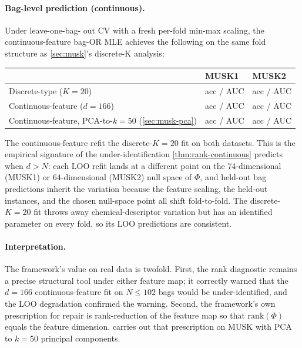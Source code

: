 \paragraph{Bag-level prediction (continuous).} Under leave-one-bag-
out CV with a fresh per-fold min-max scaling, the continuous-feature
bag-OR MLE achieves the following on the same fold structure as
\cref{sec:musk}'s discrete-K analysis:
\begin{center}\small
\begin{tabular}{lll}
\toprule
                                                   & MUSK1                          & MUSK2 \\
\midrule
Discrete-type ($K = 20$)                           & \musonemkacc{} acc / \musonemkauc{} AUC  & \musttwomkacc{} acc / \musttwomkauc{} AUC \\
Continuous-feature ($d = 166$)                     & \musonemcacc{} acc / \musonemcauc{} AUC  & \musttwomcacc{} acc / \musttwomcauc{} AUC \\
Continuous-feature, PCA-to-$k=50$ (\cref{sec:musk-pca}) & \musonempcacc{} acc / \musonempcauc{} AUC & \musttwompcacc{} acc / \musttwompcauc{} AUC \\
\bottomrule
\end{tabular}
\end{center}
The continuous-feature refit \emph{\musresumphrase{}} the
discrete-$K=20$ fit on both datasets. This is the empirical
signature of the under-identification \cref{thm:rank-continuous}
predicts when $d > N$: each LOO refit lands at a different point on
the $74$-dimensional (MUSK1) or $64$-dimensional (MUSK2) null space
of $\Phi$, and held-out bag predictions inherit the variation
because the feature scaling, the held-out instances, and the chosen
null-space point all shift fold-to-fold. The discrete-$K = 20$ fit
throws away chemical-descriptor variation but has an identified
parameter on every fold, so its LOO predictions are consistent.

\paragraph{Interpretation.} The framework's value on real data is
twofold. First, the rank diagnostic remains a precise structural
tool under either feature map; it correctly warned that the
$d = 166$ continuous-feature fit on $N \leq 102$ bags would be
under-identified, and the LOO degradation confirmed the warning.
Second, the framework's own prescription for repair is
rank-reduction of the feature map so that $\mathrm{rank}(\Phi)$
equals the feature dimension.  carries out that
prescription on MUSK with PCA to $k = 50$ principal components.

